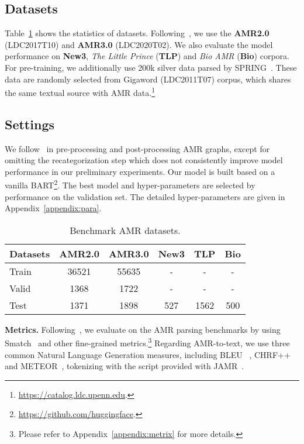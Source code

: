 \documentclass[11pt]{article}
\begin{document}
\subsection{Datasets}
Table~\ref{tab:datasets} shows the statistics of datasets. 
Following~\citet{Bevilacqua_Blloshmi_Navigli_2021}, we use the \textbf{AMR2.0} (LDC2017T10)
and \textbf{AMR3.0} (LDC2020T02).
We also evaluate the model performance on \textbf{New3}, \textit{The Little Prince} (\textbf{TLP}) and \textit{Bio AMR} (\textbf{Bio}) corpora.
For pre-training, we additionally use 200k silver data parsed by SPRING~\cite{Bevilacqua_Blloshmi_Navigli_2021}. 
These data are randomly selected from Gigaword (LDC2011T07)
corpus, which shares the same textual source with AMR data.\footnote{\url{https://catalog.ldc.upenn.edu}.}


\subsection{Settings}
We follow~\citet{Bevilacqua_Blloshmi_Navigli_2021} in pre-processing and post-processing AMR graphs, except for omitting the recategorization step which does not consistently improve model performance in our preliminary experiments.
Our model is built based on a vanilla BART\footnote{\url{https://github.com/huggingface}.}.
The best model and hyper-parameters are selected by performance on the validation set.
The detailed hyper-parameters are given in Appendix~\ref{appendix:para}.

\begin{table}
	\centering
	\small
	\begin{tabular}{lccccc}
		\toprule
        \textbf{Datasets} & AMR2.0 & AMR3.0  & New3 & TLP &Bio\\
		\midrule 	
		Train & 36521 & 55635 & - & - & - \\
		Valid & 1368 & 1722 &- & - & - \\
		Test & 1371 & 1898 & 527 & 1562 & 500 \\
\bottomrule
	\end{tabular}
	\caption{Benchmark AMR datasets.}
	\label{tab:datasets}
\end{table}

\noindent\textbf{Metrics.}
Following~\citet{Bevilacqua_Blloshmi_Navigli_2021}, we evaluate on the AMR parsing benchmarks by using Smatch~\cite{cai-knight-2013-smatch} and other fine-grained metrics.\footnote{Please refer to Appendix~\ref{appendix:metrix} for more details.}
Regarding AMR-to-text, we use three common Natural Language Generation measures, including BLEU ~\cite{papineni-etal-2002-bleu}, CHRF++ ~\cite{popovic-2017-chrf} and METEOR~\cite{banerjee-lavie-2005-meteor}, tokenizing with the script provided with JAMR~\cite{flanigan-etal-2014-discriminative}.
\end{document}
